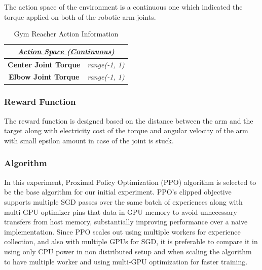 The action space of the environment is a continuous one which indicated the torque applied on both of the robotic arm joints.


\begin{table}[!htb]
    \centering
    \begin{tabular}{|c|c|}
        \hline
        \multicolumn{2}{|c|}{{\ul \textit{\textbf{Action Space (Continuous)}}}}                             \\ \hline
        \multirow{2}{*}{\textbf{Center Joint Torque}} & \multirow{2}{*}{\textit{range(-1, 1)}} \\
                                                        &                                        \\ \hline
        \multirow{2}{*}{\textbf{Elbow Joint Torque}}  & \multirow{2}{*}{\textit{range(-1, 1)}} \\
                                                        &                                        \\ \hline
        \end{tabular}
        \caption{Gym Reacher Action Information}
        \label{tab:gym_reacher_actions}
\end{table}

\subsubsection{Reward Function}

The reward function is designed based on the distance between the arm and the target along with electricity cost of the torque and angular velocity of the arm with small epsilon amount in case of the joint is stuck. 

\subsubsection{Algorithm}

In this experiment, Proximal Policy Optimization (PPO) algorithm is selected to be the base algorithm for our initial experiment. PPO’s clipped objective supports multiple SGD passes over the same batch of experiences along with multi-GPU optimizer pins that data in GPU memory to avoid unnecessary transfers from host memory, substantially improving performance over a naive implementation. Since PPO scales out using multiple workers for experience collection, and also with multiple GPUs for SGD, it is preferable to compare it in using only CPU power in non distributed setup and when scaling the algorithm to have multiple worker and using multi-GPU optimization for faster training.

